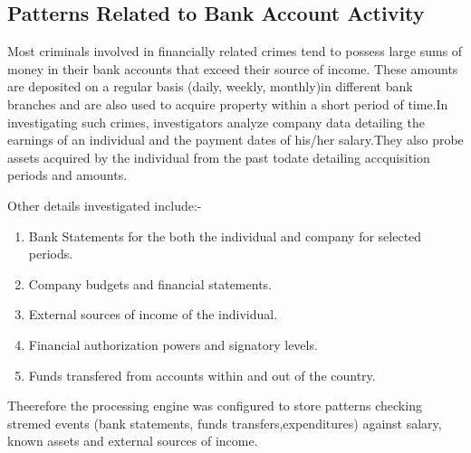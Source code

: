 \subsection{Patterns Related to Bank Account Activity}

\noindent Most criminals involved in financially related crimes tend to possess large sums of money in their bank accounts that exceed their source of income. These amounts are deposited on a regular basis (daily, weekly, monthly)in different bank branches and are also used to acquire property within a short period of time.In investigating such crimes, investigators analyze company data detailing the earnings of an individual and the payment dates of his/her salary.They also probe assets acquired by the individual from the past todate detailing accquisition periods and amounts. 

Other details investigated include:-
\begin{enumerate}
\item Bank Statements for the both the individual and company for selected periods.
\item Company budgets and financial statements.
\item External sources of income of the individual.
\item Financial authorization powers and signatory levels.
\item Funds transfered from accounts within and out of the country.
 \end{enumerate}

Theerefore the processing engine was configured to store patterns checking stremed events (bank statements, funds transfers,expenditures) against salary, known assets and external sources of income.



















